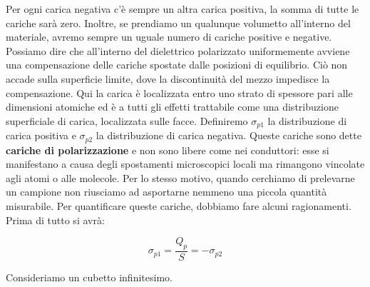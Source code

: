 Per ogni carica negativa c'è sempre un altra carica positiva, la somma di tutte le cariche sarà zero. Inoltre, se prendiamo un qualunque volumetto all'interno del materiale, avremo sempre un uguale numero di cariche positive e negative. Possiamo dire che all'interno del dielettrico polarizzato uniformemente avviene una compensazione delle cariche spostate dalle posizioni di equilibrio. Ciò non accade sulla superficie limite, dove la discontinuità del mezzo impedisce la compensazione. Qui la carica è localizzata entro uno strato di spessore pari alle dimensioni atomiche ed è a tutti gli effetti trattabile come una distribuzione superficiale di carica, localizzata sulle facce. Definiremo $ \sigma_{p1}  $ la distribuzione di carica positiva e $ \sigma_{p2}  $ la distribuzione di carica negativa. Queste cariche sono dette \textbf{cariche di polarizzazione} e non sono libere come nei conduttori: esse si manifestano a causa degli spostamenti microscopici locali ma rimangono vincolate agli atomi o alle molecole. Per lo stesso motivo, quando cerchiamo di prelevarne un campione non riusciamo ad asportarne nemmeno una piccola quantità misurabile. Per quantificare queste cariche, dobbiamo fare alcuni ragionamenti.
Prima di tutto si avrà:

\[
	\sigma_{p1} = \frac{Q_p}{S} = - \sigma_{p2}
\]

Consideriamo un cubetto infinitesimo.

